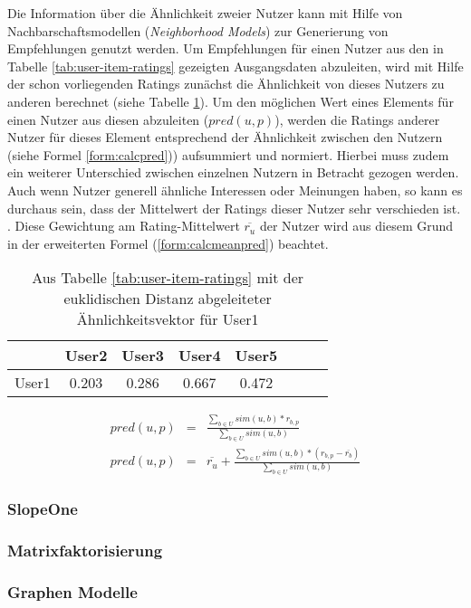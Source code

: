 Die Information über die Ähnlichkeit zweier Nutzer kann mit Hilfe von Nachbarschaftsmodellen (\textit{Neighborhood Models}) zur Generierung von Empfehlungen genutzt werden. Um Empfehlungen für einen Nutzer aus den in Tabelle \ref{tab:user-item-ratings} gezeigten Ausgangsdaten abzuleiten, wird mit Hilfe der schon vorliegenden Ratings zunächst die Ähnlichkeit von dieses Nutzers zu anderen berechnet (siehe Tabelle \ref{tab:user-user-sim}). Um den möglichen Wert eines Elements für einen Nutzer aus diesen abzuleiten ($pred(u,p)$), werden die Ratings anderer Nutzer für dieses Element entsprechend der Ähnlichkeit zwischen den Nutzern (siehe Formel  \ref{form:calcpred})) aufsummiert und normiert. Hierbei muss zudem ein weiterer Unterschied zwischen einzelnen Nutzern in Betracht gezogen werden. Auch wenn Nutzer generell ähnliche Interessen oder Meinungen haben, so kann es durchaus sein, dass der Mittelwert der Ratings dieser Nutzer sehr verschieden ist. . Diese Gewichtung am Rating-Mittelwert $\overline{r_u}$ der Nutzer wird aus diesem Grund in der erweiterten Formel (\ref{form:calcmeanpred}) beachtet. \citep{rs}
\begin{table}
  \centering
  \begin{tabular}{ | l || c | c | c | c | c | c | c | }
    \hline
           & User2 & User3 & User4 & User5 \\ \hline
User1 &    0.203 &	0.286 &	0.667 &	0.472 \\	
    \hline
  \end{tabular}
  \caption{Aus Tabelle \ref{tab:user-item-ratings} mit der euklidischen Distanz abgeleiteter Ähnlichkeitsvektor für User1}
  \label{tab:user-user-sim}
\end{table}
\begin{align}
pred(u,p) & = & \frac{ \sum_{b \in U} sim(u, b)*r_{b,p}}{ \sum_{b \in U} sim(u,b) } \label{form:calcpred} \\
pred(u, p) & = & \overline{r_u} + \frac{ \sum_{b \in U} sim(u, b)*(r_{b,p}-\overline{r_b}) } { \sum_{b \in U} sim(u,b) } \label{form:calcmeanpred}
\end{align}

\citep{hb_04}




\subsubsection{SlopeOne}

\citep[S 41]{rs}

\subsubsection{Matrixfaktorisierung}

\citep{Koren:2009:MFT:1608565.1608614}

\subsubsection{Graphen Modelle}\newpage
